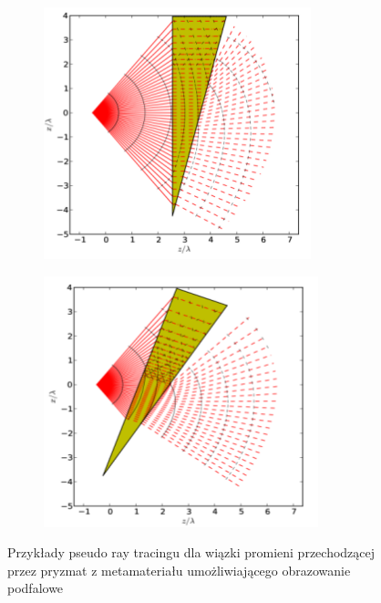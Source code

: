 \begin{figure}
	\centering
	\begin{subfigure}{.45\textwidth}
		\includegraphics[width=\textwidth]{images/multilayer/prism-ray-tracing1.png}
	\end{subfigure}
	\begin{subfigure}{.45\textwidth}
		\includegraphics[width=\textwidth]{images/multilayer/prism-ray-tracing2.png}
	\end{subfigure}
	\caption{Przykłady pseudo ray tracingu dla wiązki promieni przechodzącej przez pryzmat z metamateriału umożliwiającego obrazowanie podfalowe \cite{pastuszczak2011slanted}} 
\end{figure}








